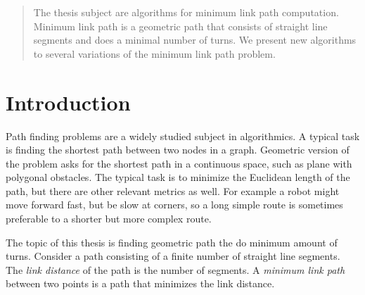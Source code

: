 \documentclass[english,gradu]{tktltiki2018}
\begin{document}




\begin{abstract}
The thesis subject are algorithms for minimum link path computation.
Minimum link path is a geometric path that consists of straight line segments and does a minimal number of turns.
We present new algorithms to several variations of the minimum link path problem.
\end{abstract}

\mytableofcontents




\section{Introduction}

Path finding problems are a widely studied subject in algorithmics.\cite{survey}
A typical task is finding the shortest path between two nodes in a graph.
Geometric version of the problem asks for the shortest path in a continuous space, such as plane with polygonal obstacles.
The typical task is to minimize the Euclidean length of the path, but there are other relevant metrics as well.
For example a robot might move forward fast, but be slow at corners, so a long simple route is sometimes preferable to a shorter but more complex route.

The topic of this thesis is finding geometric path the do minimum amount of turns.
Consider a path consisting of a finite number of straight line segments.
The \emph{link distance} of the path is the number of segments.
A \emph{minimum link path} between two points is a path that minimizes the link distance.
\end{document}
